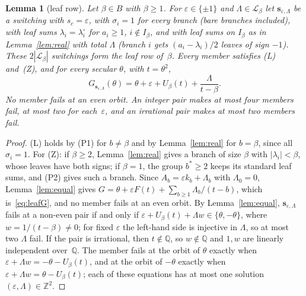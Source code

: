 \documentclass[11pt]{article}
\numberwithin{equation}{section}
\newtheorem{lemma}{Lemma}[section]
\theoremstyle{remark}
\newcommand{\Q}{\mathbb Q}
\newcommand{\Z}{\mathbb Z}
\newcommand{\s}{\mathbf s}
\newcommand{\cL}{\mathcal L}
\begin{document}
\begin{lemma}[leaf row]\label{lem:leafrow}
Let $\beta\in B$ with $\beta\ge1$. For $\varepsilon\in\{\pm1\}$ and
$\Lambda\in\cL_\beta$ let $\s_{\varepsilon,\Lambda}$ be a switching with
$s_c=\varepsilon$, with $\sigma_i=1$ for every branch (bare branches included),
with leaf sums $\lambda_i=\lambda^\circ_i$ for $a_i\ge1$, $i\notin I_\beta$,
and with leaf sums on $I_\beta$ as in Lemma~\ref{lem:real} with total
$\Lambda$ (branch $i$ gets $(a_i-\lambda_i)/2$ leaves of sign $-1$). These
$2|\cL_\beta|$ switchings form the \emph{leaf row} of~$\beta$. Every member
satisfies (L) and~(Z), and for every secular $\theta$, with $t=\theta^2$,
\begin{equation}\label{eq:leafG}
 G_{\s_{\varepsilon,\Lambda}}(\theta)=\theta+\varepsilon+U_\beta(t)
 +\frac{\Lambda}{t-\beta}.
\end{equation}
No member fails at an even orbit. An integer pair makes at most four members
fail, at most two for each~$\varepsilon$, and an irrational pair makes at most
two members fail.
\end{lemma}
\begin{proof}
(L) holds by (P1) for $b\ne\beta$ and by Lemma~\ref{lem:real} for $b=\beta$,
since all $\sigma_i=1$. For (Z): if $\beta\ge2$, Lemma~\ref{lem:real} gives a
branch of size $\beta$ with $|\lambda_i|<\beta$, whose leaves have both signs;
if $\beta=1$, the group $b^*\ge2$ keeps its standard leaf sums, and (P2) gives
such a branch. Since $A_b=\varepsilon k_b+\Lambda_b$ with $\Lambda_0=0$,
Lemma~\ref{lem:equal} gives $G=\theta+\varepsilon F(t)+\sum_{b\ge1}\Lambda_b/
(t-b)$, which is~\eqref{eq:leafG}, and no member fails at an even orbit. By
Lemma~\ref{lem:equal}, $\s_{\varepsilon,\Lambda}$ fails at a non-even pair if
and only if $\varepsilon+U_\beta(t)+\Lambda w\in\{\theta,-\theta\}$, where
$w=1/(t-\beta)\ne0$; for fixed $\varepsilon$ the left-hand side is injective in
$\Lambda$, so at most two $\Lambda$ fail. If the pair is irrational, then
$t\notin\Q$, so $w\notin\Q$ and $1,w$ are linearly independent over~$\Q$. The
member fails at the orbit of $\theta$ exactly when
$\varepsilon+\Lambda w=-\theta-U_\beta(t)$, and at the orbit of $-\theta$
exactly when $\varepsilon+\Lambda w=\theta-U_\beta(t)$; each of these equations
has at most one solution $(\varepsilon,\Lambda)\in\Z^2$.
\end{proof}
\end{document}
